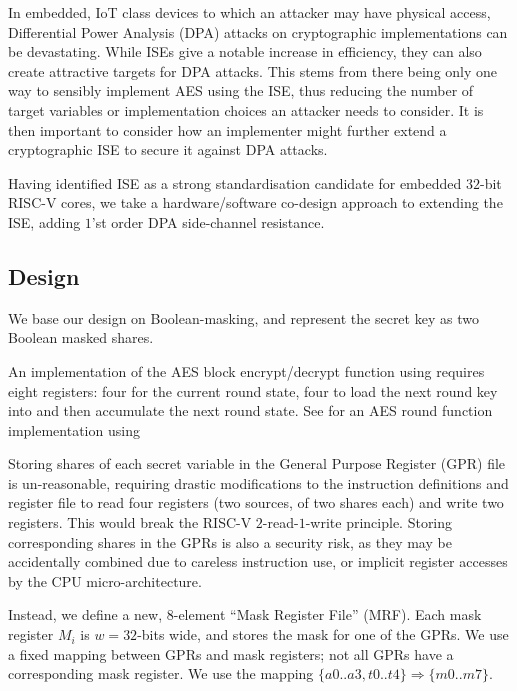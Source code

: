 
In embedded, IoT class devices to which an attacker may have
physical access,
Differential Power Analysis (DPA) attacks on cryptographic implementations
\cite{KJJ:99} can be devastating.
While ISEs give a notable increase in efficiency, they can also create
attractive targets for DPA attacks.
This stems from there being only one way to sensibly implement
AES using the ISE, thus reducing the number of target variables or
implementation choices an attacker needs to consider.
It is then important to consider how an implementer might
further extend a cryptographic ISE to secure it against DPA attacks.

Having identified ISE  as a strong standardisation candidate
for embedded $32$-bit RISC-V cores, we take a hardware/software co-design
approach to extending the ISE, adding $1$'st order DPA side-channel
resistance.

\subsection{Design}

We base our design on Boolean-masking, and represent the secret
key as two Boolean masked shares.

An implementation of the AES block encrypt/decrypt function 
using  requires eight registers:
four for the current round state,
four to load the next round key into
and
then accumulate the next round state.
See  for an AES round function implementation
using 

Storing shares of each secret variable
in the General Purpose Register (GPR) file is un-reasonable,
requiring drastic modifications to the instruction definitions and
register file to read four registers (two sources, of two shares each) and
write two registers.
This would break the RISC-V $2$-read-$1$-write principle.
Storing corresponding shares in the GPRs is also a security
risk, as they may be accidentally combined due to
careless instruction use, or implicit register accesses by the
CPU micro-architecture.

Instead, we define a new, $8$-element ``Mask Register File'' (MRF).
Each mask register $M_i$ is $w=32$-bits wide, and stores the mask for
one of the GPRs.
We use a fixed mapping between GPRs and mask registers;
not all GPRs have a corresponding mask register.
We use the mapping $\{a0..a3,t0..t4\} \Rightarrow \{m0..m7\}$.

